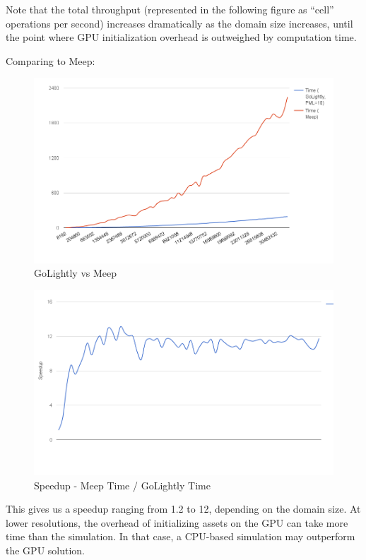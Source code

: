 Note that the total throughput (represented in the following figure as “cell” operations per second) increases dramatically as the domain size increases, until the point where GPU initialization overhead is outweighed by computation time.

Comparing to Meep:

\begin{figure}[H]
	\centering
	\includegraphics[width=\textwidth,
	keepaspectratio]{gpu-vs-meep.png}
	\caption{GoLightly vs Meep}
	\label{fig:gpuVsMeep}
\end{figure}

\begin{figure}[H]
	\centering
	\includegraphics[width=\textwidth,
	keepaspectratio]{gpu-vs-meep-speedup.png}
	\caption{Speedup - Meep Time / GoLightly Time}
	\label{fig:gpuVsMeepSpeedup}
\end{figure}

This gives us a speedup ranging from 1.2 to 12, depending on the domain size. At lower resolutions, the overhead of initializing assets on the GPU can take more time than the simulation. In that case, a CPU-based simulation may outperform the GPU solution.

